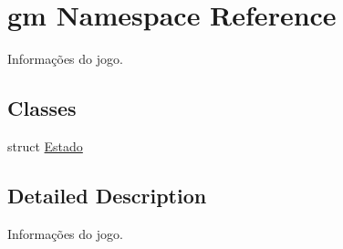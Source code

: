 \hypertarget{namespacegm}{}\section{gm Namespace Reference}
\label{namespacegm}


Informações do jogo.  


\subsection*{Classes}
\begin{DoxyCompactItemize}
\item 
struct \hyperlink{structgm_1_1Estado}{Estado}
\end{DoxyCompactItemize}


\subsection{Detailed Description}
Informações do jogo. 